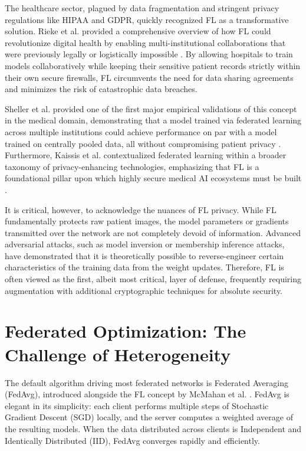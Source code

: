\documentclass[12pt,a4paper]{report}
\begin{document}
The healthcare sector, plagued by data fragmentation and stringent privacy regulations like HIPAA and GDPR, quickly recognized FL as a transformative solution. Rieke et al. provided a comprehensive overview of how FL could revolutionize digital health by enabling multi-institutional collaborations that were previously legally or logistically impossible \cite{rieke2020}. By allowing hospitals to train models collaboratively while keeping their sensitive patient records strictly within their own secure firewalls, FL circumvents the need for data sharing agreements and minimizes the risk of catastrophic data breaches.

Sheller et al. provided one of the first major empirical validations of this concept in the medical domain, demonstrating that a model trained via federated learning across multiple institutions could achieve performance on par with a model trained on centrally pooled data, all without compromising patient privacy \cite{sheller2020federated}. Furthermore, Kaissis et al. contextualized federated learning within a broader taxonomy of privacy-enhancing technologies, emphasizing that FL is a foundational pillar upon which highly secure medical AI ecosystems must be built \cite{kaissis2020secure}.

It is critical, however, to acknowledge the nuances of FL privacy. While FL fundamentally protects raw patient images, the model parameters or gradients transmitted over the network are not completely devoid of information. Advanced adversarial attacks, such as model inversion or membership inference attacks, have demonstrated that it is theoretically possible to reverse-engineer certain characteristics of the training data from the weight updates. Therefore, FL is often viewed as the first, albeit most critical, layer of defense, frequently requiring augmentation with additional cryptographic techniques for absolute security.

\section{Federated Optimization: The Challenge of Heterogeneity}

The default algorithm driving most federated networks is Federated Averaging (FedAvg), introduced alongside the FL concept by McMahan et al. \cite{mcmahan2017communication}. FedAvg is elegant in its simplicity: each client performs multiple steps of Stochastic Gradient Descent (SGD) locally, and the server computes a weighted average of the resulting models. When the data distributed across clients is Independent and Identically Distributed (IID), FedAvg converges rapidly and efficiently.
\end{document}
